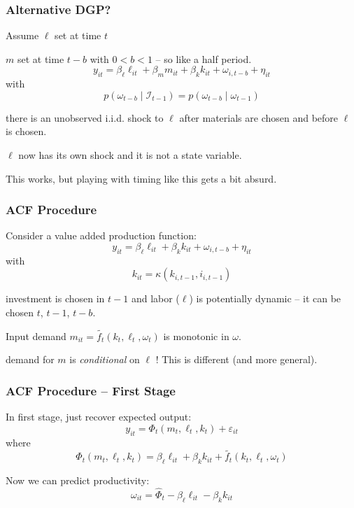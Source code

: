 \documentclass[11pt, aspectratio=169]{beamer}
\newenvironment{wideitemize}{\itemize\addtolength{\itemsep}{10pt}}{\enditemize}
\begin{document}
\begin{frame}[c]\frametitle{Alternative DGP?}
    
\begin{wideitemize}
	\item Assume $\ell$ set at time $t$
	\item $m$ set at time $t-b$ with $0<b<1$ -- so like a half period.
	$$y_{it} = \beta_{\ell} \ell_{it} + \beta_m m_{it} + \beta_k k_{it} + \omega_{i,t-b} + \eta_{it}$$
	with 
	$$p(\omega_{t-b}\mid \mathcal{I}_{t-1}) = p(\omega_{t-b}\mid\omega_{t-1})$$
	\item there is an unobserved i.i.d. shock to $\ell$ after materials are chosen and before $\ell$ is chosen. 
	\item $\ell$ now has its own shock and it is not a state variable. 
	\item This works, but playing with timing like this gets a bit absurd. 
\end{wideitemize}
    

\end{frame}



\begin{frame}[c]\frametitle{ACF Procedure}
    
\begin{wideitemize}
	\item Consider a value added production function:
	$$y_{it} = \beta_{\ell} \ell_{it} + \beta_k k_{it} + \omega_{i,t-b} + \eta_{it}$$
	with 
	$$k_{it} = \kappa(k_{i,t-1},i_{i,t-1})$$
	\item investment is chosen in $t-1$ and labor ($\ell$) is potentially dynamic -- it can be chosen $t$, $t-1$, $t-b$.
	\item Input demand $m_{it} = \tilde{f_t}(k_t,\ell_t,\omega_t)$ is monotonic in $\omega$.
	\item demand for $m$ is \emph{conditional} on $\ell\,\,$! This is different (and more general).
\end{wideitemize}

\end{frame}

\begin{frame}[c]\frametitle{ACF Procedure -- First Stage}
    
\begin{wideitemize}
	\item In first stage, just recover expected output:
	$$y_{it} = \Phi_t(m_t,\ell_t,k_t) + \varepsilon_{it}$$
	where
	$$\Phi_t(m_t,\ell_t,k_t) =  \beta_{\ell} \ell_{it} + \beta_k k_{it} + \tilde{f_t}(k_t,\ell_t,\omega_t)  $$
	\item Now we can predict productivity:
	$$\omega_{it} = \hat{\Phi}_t - \beta_{\ell} \ell_{it} - \beta_k k_{it} $$
\end{wideitemize}


\end{frame}
\end{document}
